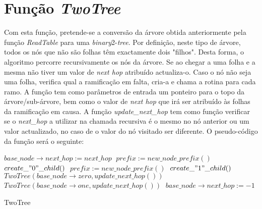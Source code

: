 \documentclass[twocolumn]{article}
\begin{document}
\section{Função \textit{TwoTree}}
Com esta função, pretende-se a conversão da árvore obtida anteriormente pela função \textit{ReadTable} para uma \textit{binary}2-\textit{tree}. Por definição, neste tipo de árvore, todos os nós que não são folhas têm exactamente dois "filhos". Desta forma, o algoritmo percorre recursivamente os nós da árvore. Se ao chegar a uma folha e a mesma não tiver um valor de \textit{next hop} atribuído actualiza-o. Caso o nó não seja uma folha, verifica qual a ramificação em falta, cria-a e chama a rotina para cada ramo. A função tem como parâmetros de entrada um ponteiro para o topo da árvore/sub-árvore, bem como o valor de \textit{next hop} que irá ser atribuído às folhas da ramificação em  causa. A função \textit{update\_next\_hop} tem como função verificar se o \textit{next\_hop} a utilizar na chamada recursiva é o mesmo no nó anterior ou um valor actualizado, no caso de o valor do nó visitado ser diferente.
O pseudo-código da função será o seguinte:
\begin{algorithmic}
 		\State $base\_node \rightarrow next\_hop:=next\_hop\;$
 	\EndIf
 \Else
 		\State $prefix:=new\_node\_prefix()\;$
 		\State $create\_"0"\_child()\;$
 	\Else
			\State $prefix:=new\_node\_prefix()\;$
			\State $create\_"1"\_child()\;$
		\EndIf
 	\EndIf
 	\State $TwoTree(base\_node \rightarrow zero, update\_next\_hop())\;$
 	\State $TwoTree(base\_node \rightarrow one, update\_next\_hop())\;$
 	\State $base\_node \rightarrow next\_hop:=-1\;$
 \EndIf
 
 \Return\;
 \caption{TwoTree}
\end{algorithmic}
\end{document}
